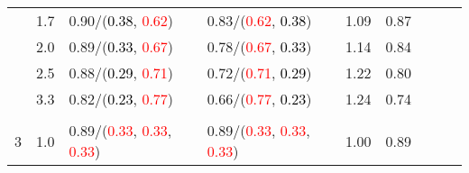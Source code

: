 \documentclass[10pt,a4paper]{report}
\begin{document}
\begin{table}[!htbp]
\begin{center}
{\begin{tabular}{ccllccccc}
				  & 1.7                               & 0.90/(\textcolor{black}{0.38}, \textcolor{red}{0.62})                                                                                                                                         & 0.83/(\textcolor{red}{0.62}, \textcolor{black}{0.38})                                                                                                                                         & 1.09             & 0.87                     \\
				  & 2.0                               & 0.89/(\textcolor{black}{0.33}, \textcolor{red}{0.67})                                                                                                                                         & 0.78/(\textcolor{red}{0.67}, \textcolor{black}{0.33})                                                                                                                                         & 1.14             & 0.84                     \\
				  & 2.5                               & 0.88/(\textcolor{black}{0.29}, \textcolor{red}{0.71})                                                                                                                                         & 0.72/(\textcolor{red}{0.71}, \textcolor{black}{0.29})                                                                                                                                         & 1.22             & 0.80                     \\
				  & 3.3                               & 0.82/(\textcolor{black}{0.23}, \textcolor{red}{0.77})                                                                                                                                         & 0.66/(\textcolor{red}{0.77}, \textcolor{black}{0.23})                                                                                                                                         & 1.24             & 0.74                     \\
				  &                                   &                                                                                                                                                                                               &                                                                                                                                                                                               &                                             \\
				3 & 1.0                               & 0.89/(\textcolor{red}{0.33}, \textcolor{red}{0.33}, \textcolor{red}{0.33})                                                                                                                    & 0.89/(\textcolor{red}{0.33}, \textcolor{red}{0.33}, \textcolor{red}{0.33})                                                                                                                    & 1.00             & 0.89                     \\

\end{tabular}}
\end{center}
\end{table}
\end{document}
